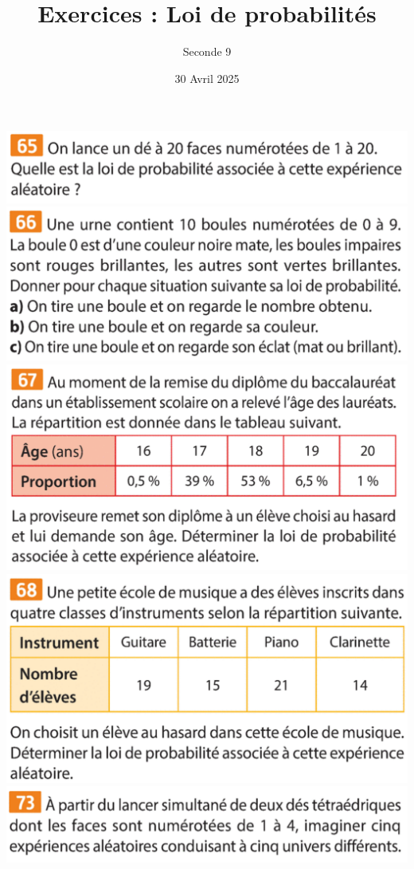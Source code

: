 \documentclass{article}
\title{Exercices : Loi de probabilités}
\date{30 Avril 2025}
\author{Seconde 9}
\begin{document}
\maketitle
\begin{center}
\includegraphics[width=\textwidth]{Exercice_1.png}
\includegraphics[width=\textwidth]{Exercice_2.png}
\includegraphics[width=\textwidth]{Exercice_3.png}
\includegraphics[width=\textwidth]{Exercice_4.png}
\includegraphics[width=\textwidth]{Exercice_5.png}

\end{center}
\end{document}
